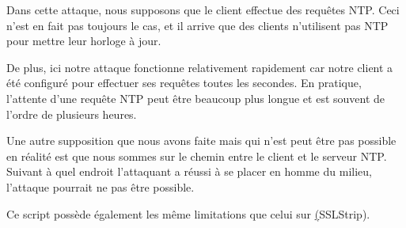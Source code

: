 Dans cette attaque, nous supposons que le client effectue des requêtes NTP. Ceci n'est en fait pas toujours le cas, et il arrive que des clients n'utilisent pas NTP pour mettre leur horloge à jour.

De plus, ici notre attaque fonctionne relativement rapidement car notre client a été configuré pour effectuer ses requêtes toutes les secondes. En pratique, l'attente d'une requête NTP peut être beaucoup plus longue et est souvent de l'ordre de plusieurs heures.

Une autre supposition que nous avons faite mais qui n'est peut être pas possible en réalité est que nous sommes sur le chemin entre le client et le serveur NTP. Suivant à quel endroit l'attaquant a réussi à se placer en homme du milieu, l'attaque pourrait ne pas être possible.

Ce script possède également les même limitations que celui sur \hyperref[sec:sslstrip](SSLStrip).
